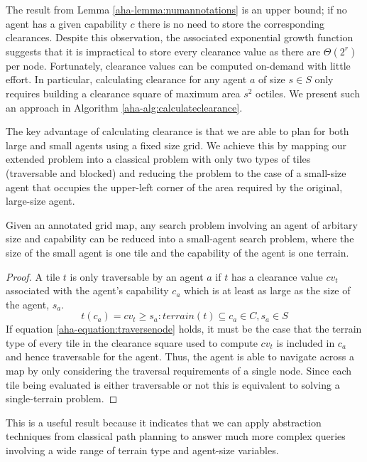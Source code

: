 The result from Lemma \ref{aha-lemma:numannotations} is an upper bound; if no agent has a given capability $c$ there is no need to store the corresponding clearances.
Despite this observation, the associated exponential growth function suggests that it is impractical to store every clearance value as there are $\Theta(2^{r})$ per node.
Fortunately, clearance values can be computed on-demand with little effort. 
In particular, calculating clearance for any agent $a$ of size $s \in S$ only requires building a clearance square of maximum area $s^2$ octiles. 
We present such an approach in Algorithm \ref{aha-alg:calculateclearance}. 

\par \indent
The key advantage of calculating clearance is that we are able to plan for both large and small agents using a fixed size grid. 
We achieve this by mapping our extended problem into a classical problem with only two types of tiles (traversable and blocked) and reducing the problem to the case of a small-size agent that occupies the upper-left corner of the area required by the original, large-size agent. 
\begin{theorem}
\label{aha-theorem:reducibility}
Given an annotated grid map, any search problem involving an agent of arbitary size and capability can be reduced into a small-agent search problem, where the size of the small agent is one tile and the capability of the agent is one terrain.
\end{theorem}

\begin{proof}
A tile $t$ is only traversable by an agent $a$ if $t$ has a clearance value $cv_{t}$ associated with the agent's capability $c_{a}$ which is at least as large as the size of the agent, $s_{a}$. 
\begin{equation}
\label{aha-equation:traversenode}
t(c_{a}) = cv_{t} \geq s_{a} : terrain(t) \subseteq c_{a} \in C, s_{a} \in S
\end{equation}
If equation \ref{aha-equation:traversenode} holds, it must be the case that the terrain type of every tile in the clearance square used to compute $cv_{t}$ is included in $c_{a}$ and hence traversable for the agent. 
Thus, the agent is able to navigate across a map by only considering the traversal requirements of a single node.
Since each tile being evaluated is either traversable or not this is equivalent to solving a single-terrain problem.
\end{proof}
This is a useful result because it indicates that we can apply abstraction techniques from classical path planning to answer much more complex queries involving a wide range of terrain type and agent-size variables.
